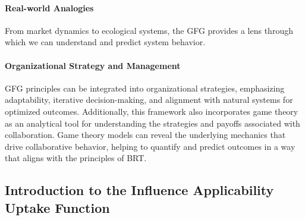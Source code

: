 \documentclass[sn-nature]{sn-jnl}%
\theoremstyle{thmstyleone}%
\theoremstyle{thmstyletwo}%
\theoremstyle{thmstylethree}%
\begin{document}
\paragraph{Real-world Analogies}
From market dynamics to ecological systems, the GFG provides a lens through which we can understand and predict system behavior.
\paragraph{Organizational Strategy and Management}
GFG principles can be integrated into organizational strategies, emphasizing adaptability, iterative decision-making, and alignment with natural systems for optimized outcomes\cite{ujwary-gil_organizational_2020}. Additionally, this framework also incorporates game theory as an analytical tool for understanding the strategies and payoffs associated with collaboration. Game theory models can reveal the underlying mechanics that drive collaborative behavior, helping to quantify and predict outcomes in a way that aligns with the principles of BRT.


\subsection{Introduction to the Influence Applicability Uptake Function}
\end{document}
